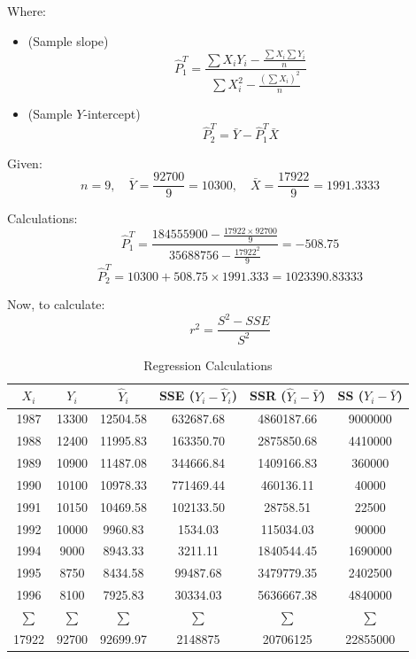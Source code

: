 \documentclass[12pt]{article}
\begin{document}
Where:
\begin{itemize}
    \item (Sample slope) 
    \[
    \hat{P}_1^T = \frac{\sum X_i Y_i - \frac{\sum X_i \sum Y_i}{n}}{\sum X_i^2 - \frac{(\sum X_i)^2}{n}}
    \]
    \item (Sample \( Y \)-intercept) 
    \[
    \hat{P}_2^T = \bar{Y} - \hat{P}_1^T \bar{X}
    \]
\end{itemize}

Given:
\[
n = 9, \quad \bar{Y} = \frac{92700}{9} = 10300, \quad \bar{X} = \frac{17922}{9} = 1991.3333
\]

Calculations:
\[
\hat{P}_1^T = \frac{184555900 - \frac{17922 \times 92700}{9}}{35688756 - \frac{17922^2}{9}} = -508.75
\]
\[
\hat{P}_2^T = 10300 + 508.75 \times 1991.333 = 1023390.83333
\]

Now, to calculate:
\[
r^2 = \frac{S^2 - SSE}{S^2}
\]

\begin{table}[h!]
    \centering
    \caption{Regression Calculations}
    \begin{tabular}{cccccc}
        \toprule
        \( X_i \) & \( Y_i \) & \( \hat{Y}_i \) & SSE (\( Y_i - \hat{Y}_i \)) & SSR (\( \hat{Y}_i - \bar{Y} \)) & SS (\( Y_i - \bar{Y} \)) \\
        \midrule
        1987 & 13300 & 12504.58 & 632687.68 & 4860187.66 & 9000000 \\
        1988 & 12400 & 11995.83 & 163350.70 & 2875850.68 & 4410000 \\
        1989 & 10900 & 11487.08 & 344666.84 & 1409166.83 & 360000 \\
        1990 & 10100 & 10978.33 & 771469.44 & 460136.11 & 40000 \\
        1991 & 10150 & 10469.58 & 102133.50 & 28758.51 & 22500 \\
        1992 & 10000 & 9960.83 & 1534.03 & 115034.03 & 90000 \\
        1994 & 9000 & 8943.33 & 3211.11 & 1840544.45 & 1690000 \\
        1995 & 8750 & 8434.58 & 99487.68 & 3479779.35 & 2402500 \\
        1996 & 8100 & 7925.83 & 30334.03 & 5636667.38 & 4840000 \\
        \midrule
        \(\sum\) & \(\sum\) & \(\sum\) & \(\sum\) & \(\sum\) & \(\sum\) \\
        17922 & 92700 & 92699.97 & 2148875 & 20706125 & 22855000 \\
        \bottomrule
    \end{tabular}
\end{table}
\end{document}
